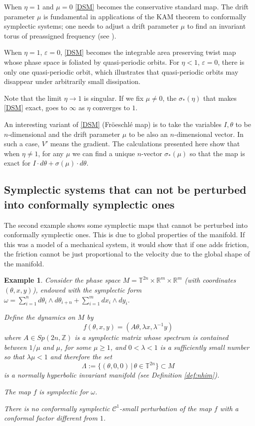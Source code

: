 \documentclass[11pt]{amsart}
\newtheorem{ex}[thm]{Example}
\theoremstyle{definition}
\theoremstyle{remark}
\numberwithin{equation}{section}
\newcommand{\Z}{\mathbb Z}
\newcommand{\eps}{\varepsilon}
\newcommand{\C}{\mathcal{C}}
\def\torus{{\mathbb T}}
\def\real{{\mathbb R}}
\begin{document}
When $\eta=1$ and $\mu=0$ \eqref{DSM}  becomes  the conservative standard map.
The drift parameter $\mu$  is fundamental in applications of  the KAM theorem to conformally symplectic
systems; one needs to adjust a drift parameter $\mu$ to find an invariant torus
of preassigned frequency (see \cite{CallejaCL13}).

When $\eta = 1$, $\eps = 0$, \eqref{DSM} becomes  the integrable area preserving twist map
whose phase space
is foliated by quasi-periodic orbits. For $\eta < 1$, $\eps = 0$,
there is  only one quasi-periodic orbit, which illustrates that quasi-periodic orbits may disappear
under arbitrarily small dissipation.

Note that the limit $\eta \to 1$ is singular. If we fix $\mu \ne 0$,
the $\sigma_*(\eta)$ that makes \eqref{DSM} exact, goes to $\infty$ as $\eta$
converges to $1$.

\medskip
An interesting  variant of \eqref{DSM} (Fr\"oeschl\'e map)
is to take
the variables $I,\theta$ to be $n$-dimensional
and the drift parameter $\mu$ to be also an $n$-dimensional
vector. In such a case, $V'$ means  the gradient.
The calculations presented here show that when $\eta \ne 1$,
for any $\mu$ we can find a unique $n$-vector $\sigma_*(\mu)$
so that the map is exact for $I\cdot d\theta + \sigma(\mu) \cdot d\theta$.


\subsection{Symplectic systems that can not be perturbed into conformally symplectic ones}

The second example  shows  some symplectic maps
that cannot be perturbed into conformally symplectic ones.
This  is due to global properties of the manifold.
If this was a model of a mechanical system,
it would show that if one adds friction, the friction cannot be
just proportional to the velocity due to the global shape of
the manifold.




\begin{ex}\label{ex:perturbed}
  Consider the phase space $ M = \torus^{2n}  \times \real^{m} \times \real^m$
    (with coordinates $(\theta,x,y)$),
    endowed with the symplectic form
    $\omega = \sum_{i=1}^n d\theta_i \wedge d\theta_{i+n} + \sum_{i = 1}^m dx_i \wedge dy_i$.


Define the dynamics on $M$ by
\[
f(\theta, x,y)=
(A\theta, \lambda x ,\lambda^{-1} y )
\]
where $A \in Sp(2n, \Z) $ is a symplectic matrix whose spectrum is contained  between $1/\mu$ and $\mu$, for some $\mu \ge 1$, and  $0 < \lambda < 1 $ is a sufficiently  small number so that $\lambda \mu <1$ and therefore  the set
\[
\Lambda:=\{ (\theta, 0, 0)\,|\, \theta \in \torus^{2n}\} \subset M
\]
is a normally hyperbolic invariant manifold (see Definition \ref{def:nhim}).

The map $f$ is symplectic for $\omega$.

There is no conformally symplectic $\C^1$-small perturbation of
the map $f$ with a conformal factor different from $1$.
\end{ex}
\end{document}
